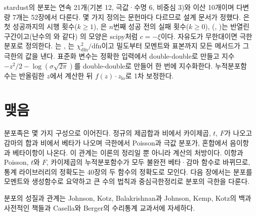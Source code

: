 \begin{instardust}
stardust의 분포는 연속 21개(기본 12, 극값·수명 6, 비중심 3)와 이산 10개이며 다변량 7개는 52장에서 다룬다. 몇 가지 정의는 문헌마다 다르므로 설계 문서가 정했다. 은 첫 성공까지의 시행 횟수($k\ge1$), 은 $n$번째 성공 전의 실패 횟수($k\ge0$), (, )는 반열린 구간이고(난수의 와 같다) 의 모양은 scipy처럼 $c=-\xi$이다. 자유도가 무한대이면 극한 분포로 정의한다. 는 , 는 $\chi^2_{\text{dfn}}/\text{dfn}$이고 밀도부터 모멘트와 표본까지 모든 메서드가 그 극한의 값을 낸다. 표준화 변수는 정확한 입력에서 double-double로 만들고 지수 $-z^2/2-\log(\sigma\sqrt{2\pi})$를 double-double로 만들어 한 번에 지수화한다. 누적분포함수는 반올림한 $z$에서 계산한 뒤 $f(z)\cdot z_{\mathrm{lo}}$로 1차 보정한다.
\end{instardust}

\section{맺음}

분포족은 몇 가지 구성으로 이어진다. 정규의 제곱합과 비에서 카이제곱, $t$, $F$가 나오고 감마의 합과 비에서 베타가 나오며 극한에서 Poisson과 극값 분포가, 혼합에서 음이항과 베타이항이 나온다. 이 관계는 이론의 정리일 뿐 아니라 계산의 처방이다. 이항과 Poisson, $t$와 $F$, 카이제곱의 누적분포함수가 모두 불완전 베타·감마 함수로 바뀌므로, 통계 라이브러리의 정확도는 40장의 두 함수의 정확도로 모인다. 다음 장에서는 분포를 모멘트와 생성함수로 요약하고 큰 수의 법칙과 중심극한정리로 분포의 극한을 다룬다.

분포의 성질과 관계는 Johnson, Kotz, Balakrishnan\cite{johnson1994continuous,johnson1995continuous}과 Johnson, Kemp, Kotz\cite{johnson2005discrete}의 백과사전적인 책들과 Casella와 Berger의 수리통계 교과서\cite{casella2002}에 자세하다.

\chapterreferences
